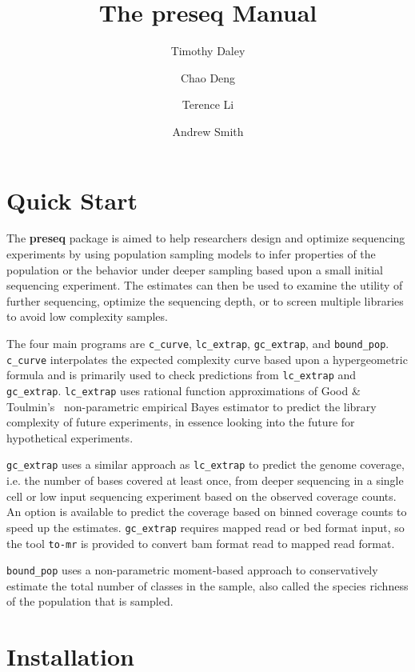 \documentclass[11pt, titlepage]{article}
\title{The \textbf{preseq} Manual}
\author{Timothy Daley \and Chao Deng \and Terence Li \and Andrew Smith }
\newcommand{\fn}[1]{\texttt{#1}}
\begin{document}
\maketitle

\tableofcontents

\newpage

\section{Quick Start}
\label{chap:quickstart}

The \textbf{preseq} package is aimed to help researchers design and
optimize sequencing experiments by using population sampling models to
infer properties of the population or the behavior under deeper
sampling based upon a small initial sequencing experiment.  The
estimates can then be used to examine the utility of further
sequencing, optimize the sequencing depth, or to screen multiple
libraries to avoid low complexity samples.

The four main programs are \fn{c\_curve}, \fn{lc\_extrap},
\fn{gc\_extrap}, and \fn{bound\_pop}.  \fn{c\_curve} interpolates the
expected complexity curve based upon a hypergeometric formula and is
primarily used to check predictions from \fn{lc\_extrap} and
\fn{gc\_extrap}.  \fn{lc\_extrap} uses rational function
approximations of Good \& Toulmin's~\cite{good1956number}
non-parametric empirical Bayes estimator to predict the library
complexity of future experiments, in essence looking into the future
for hypothetical experiments.

\fn{gc\_extrap} uses a similar approach as \fn{lc\_extrap} to predict
the genome coverage, i.e. the number of bases covered at least once,
from deeper sequencing in a single cell or low input sequencing
experiment based on the observed coverage counts.  An option is
available to predict the coverage based on binned coverage counts to
speed up the estimates.  \fn{gc\_extrap} requires mapped read or bed
format input, so the tool \fn{to-mr} is provided to convert bam format
read to mapped read format.

\fn{bound\_pop} uses a non-parametric moment-based approach to
conservatively estimate the total number of classes in the sample,
also called the species richness of the population that is sampled.

\newpage

\section{Installation}
\label{sec:install}
\end{document}
